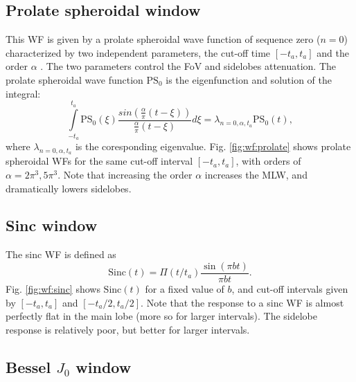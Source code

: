 \documentclass[useAMS,usenatbib]{mn2e}
\begin{document}
\subsection{Prolate spheroidal window}


This WF is given by a prolate spheroidal wave function of sequence zero ($n=0$) characterized
by two independent parameters, the cut-off time $[-t_a,t_a]$ and the order $\alpha$ 
\citep{delsarte1985discrete, walter2006prolate}. 
The two parameters control the  FoV and sidelobes attenuation.
The prolate spheroidal wave function $\mathrm{PS}_0$ is the eigenfunction and solution of the integral:
\begin{equation}
\int\limits_{-t_a}^{t_a} \mathrm{PS}_{0}(\xi) \frac{sin(\frac{\alpha}{\pi}(t-\xi))}{\frac{\alpha}{\pi}(t-\xi)}d\xi=\lambda_{n=0,\alpha,t_a}\mathrm{PS}_{0}(t), 
\end{equation}
where $\lambda_{n=0,\alpha,t_a}$ is the coresponding eigenvalue. Fig. \ref{fig:wf:prolate} shows prolate 
spheroidal WFs for the same cut-off interval $[-t_a,t_a]$, with orders of $\alpha=2\pi^3, 5\pi^3$. 
Note that increasing the order $\alpha$ increases the MLW, and dramatically lowers sidelobes.

\subsection{Sinc window}


The sinc WF is defined as 
\begin{equation}
\mathrm{Sinc}(t)= \Pi(t/t_a) \frac{\sin(\pi b t)}{\pi b t} .
\end{equation}
Fig. \ref{fig:wf:sinc} shows $\mathrm{Sinc}(t)$ for a fixed value of $b$, and cut-off intervals given 
by $[-t_a,t_a]$ and $[-t_a/2,t_a/2]$. Note that the response to a sinc WF is almost perfectly flat in the main lobe (more so for larger intervals). The sidelobe response is relatively poor, but better for larger intervals.

\subsection{Bessel $J_0$ window}
\label{Bessel}
\end{document}
